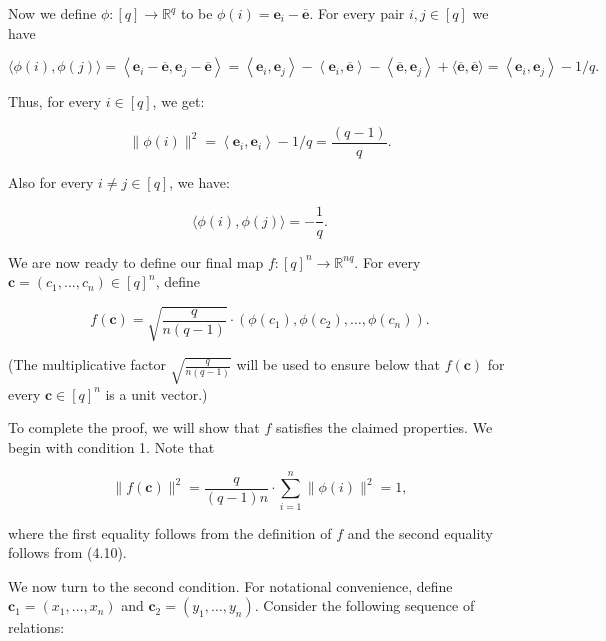\documentclass[10pt]{article}
\begin{document}
Now we define $\phi:[q] \rightarrow \mathbb{R}^{q}$ to be $\phi(i)=\mathbf{e}_{i}-\overline{\mathbf{e}}$. For every pair $i, j \in[q]$ we have

$$
\langle\phi(i), \phi(j)\rangle=\left\langle\mathbf{e}_{i}-\overline{\mathbf{e}}, \mathbf{e}_{j}-\overline{\mathbf{e}}\right\rangle=\left\langle\mathbf{e}_{i}, \mathbf{e}_{j}\right\rangle-\left\langle\mathbf{e}_{i}, \overline{\mathbf{e}}\right\rangle-\left\langle\overline{\mathbf{e}}, \mathbf{e}_{j}\right\rangle+\langle\overline{\mathbf{e}}, \overline{\mathbf{e}}\rangle=\left\langle\mathbf{e}_{i}, \mathbf{e}_{j}\right\rangle-1 / q .
$$

Thus, for every $i \in[q]$, we get:


\begin{equation*}
\|\phi(i)\|^{2}=\left\langle\mathbf{e}_{i}, \mathbf{e}_{i}\right\rangle-1 / q=\frac{(q-1)}{q} . \tag{4.10}
\end{equation*}


Also for every $i \neq j \in[q]$, we have:


\begin{equation*}
\langle\phi(i), \phi(j)\rangle=-\frac{1}{q} . \tag{4.11}
\end{equation*}


We are now ready to define our final map $f:[q]^{n} \rightarrow \mathbb{R}^{n q}$. For every $\mathbf{c}=\left(c_{1}, \ldots, c_{n}\right) \in[q]^{n}$, define

$$
f(\mathbf{c})=\sqrt{\frac{q}{n(q-1)}} \cdot\left(\phi\left(c_{1}\right), \phi\left(c_{2}\right), \ldots, \phi\left(c_{n}\right)\right) .
$$

(The multiplicative factor $\sqrt{\frac{q}{n(q-1)}}$ will be used to ensure below that $f(\mathbf{c})$ for every $\mathbf{c} \in[q]^{n}$ is a unit vector.)

To complete the proof, we will show that $f$ satisfies the claimed properties. We begin with condition 1. Note that

$$
\|f(\mathbf{c})\|^{2}=\frac{q}{(q-1) n} \cdot \sum_{i=1}^{n}\|\phi(i)\|^{2}=1,
$$

where the first equality follows from the definition of $f$ and the second equality follows from (4.10).

We now turn to the second condition. For notational convenience, define $\mathbf{c}_{1}=\left(x_{1}, \ldots, x_{n}\right)$ and $\mathbf{c}_{2}=\left(y_{1}, \ldots, y_{n}\right)$. Consider the following sequence of relations:
\end{document}
